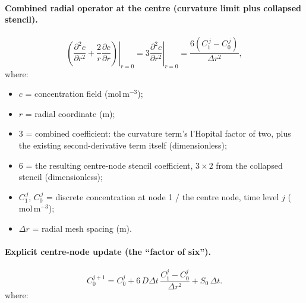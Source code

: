 \documentclass[11pt,a4paper]{article}
\newcommand{\conc}{c}
\newcommand{\Cd}[2]{C_{#1}^{#2}}
\newcommand{\pd}[2]{\frac{\partial #1}{\partial #2}}
\newcommand{\pdd}[2]{\frac{\partial^{2} #1}{\partial #2^{2}}}
\newcommand{\dr}{\Delta r}
\newcommand{\dt}{\Delta t}
\newcommand{\Diff}{D}
\begin{document}
\paragraph{Combined radial operator at the centre (curvature limit plus collapsed stencil).}

\begin{equation}
\left.\left(\pdd{\conc}{r} + \frac{2}{r}\pd{\conc}{r}\right)\right|_{r=0} = 3\left.\pdd{\conc}{r}\right|_{r=0} = \frac{6\left(C_1^{\,j} - C_0^{\,j}\right)}{\dr^{2}},
\label{eq:centre-curvature-limit}
\end{equation}
\vspace{-0.3em}
\noindent where:

\begin{itemize}[leftmargin=1.6em,itemsep=1pt,topsep=3pt,parsep=0pt]
  \item $c$ = concentration field ($\mathrm{mol\,m^{-3}}$);
  \item $r$ = radial coordinate ($\mathrm{m}$);
  \item $3$ = combined coefficient: the curvature term's l'Hopital factor of two, plus the existing second-derivative term itself (dimensionless);
  \item $6$ = the resulting centre-node stencil coefficient, $3\times2$ from the collapsed stencil (dimensionless);
  \item $C_1^{\,j},\,C_0^{\,j}$ = discrete concentration at node 1 / the centre node, time level $j$ ($\mathrm{mol\,m^{-3}}$);
  \item $\dr$ = radial mesh spacing ($\mathrm{m}$).
\end{itemize}


\paragraph{Explicit centre-node update (the ``factor of six'').}

\begin{equation}
  \Cd{0}{j+1} = \Cd{0}{j}
  + 6\,\Diff\dt\,\frac{\Cd{1}{j} - \Cd{0}{j}}{\dr^{2}}
  + S_0\,\dt .
  \label{eq:centre-update}
\end{equation}
\vspace{-0.3em}
\noindent where:
\end{document}
